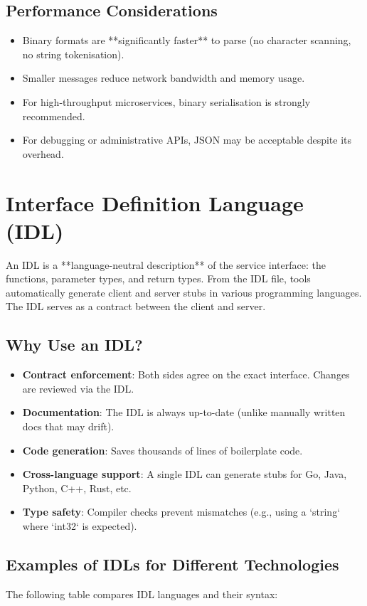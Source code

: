 \documentclass[a4paper]{article}
\begin{document}
\subsection{Performance Considerations}
\begin{itemize}
    \item Binary formats are **significantly faster** to parse (no character scanning, no string tokenisation).
    \item Smaller messages reduce network bandwidth and memory usage.
    \item For high-throughput microservices, binary serialisation is strongly recommended.
    \item For debugging or administrative APIs, JSON may be acceptable despite its overhead.
\end{itemize}

\section{Interface Definition Language (IDL)}
An IDL is a **language-neutral description** of the service interface: the functions, parameter types, and return types. From the IDL file, tools automatically generate client and server stubs in various programming languages. The IDL serves as a contract between the client and server.

\subsection{Why Use an IDL?}
\begin{itemize}
    \item \textbf{Contract enforcement}: Both sides agree on the exact interface. Changes are reviewed via the IDL.
    \item \textbf{Documentation}: The IDL is always up-to-date (unlike manually written docs that may drift).
    \item \textbf{Code generation}: Saves thousands of lines of boilerplate code.
    \item \textbf{Cross-language support}: A single IDL can generate stubs for Go, Java, Python, C++, Rust, etc.
    \item \textbf{Type safety}: Compiler checks prevent mismatches (e.g., using a `string` where `int32` is expected).
\end{itemize}

\subsection{Examples of IDLs for Different Technologies}
The following table compares IDL languages and their syntax:
\end{document}
